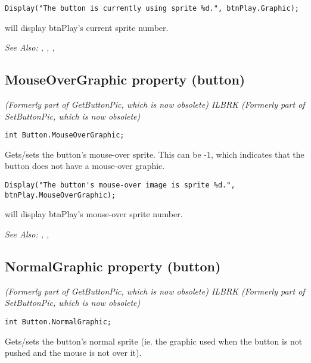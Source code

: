 \begin{verbatim}
Display("The button is currently using sprite %d.", btnPlay.Graphic);
\end{verbatim}
will display btnPlay's current sprite number.

\it{See Also:} ,
,
,


\subsection{MouseOverGraphic property (button)}\label{Button.MouseOverGraphic}%

\it{(Formerly part of GetButtonPic, which is now obsolete)} ILBRK
\it{(Formerly part of SetButtonPic, which is now obsolete)}

\begin{verbatim}
int Button.MouseOverGraphic;
\end{verbatim}
Gets/sets the button's mouse-over sprite. This can be -1, which indicates that the button
does not have a mouse-over graphic.

\begin{verbatim}
Display("The button's mouse-over image is sprite %d.", btnPlay.MouseOverGraphic);
\end{verbatim}
will display btnPlay's mouse-over sprite number.

\it{See Also:} ,
,


\subsection{NormalGraphic property (button)}\label{Button.NormalGraphic}%

\it{(Formerly part of GetButtonPic, which is now obsolete)} ILBRK
\it{(Formerly part of SetButtonPic, which is now obsolete)}

\begin{verbatim}
int Button.NormalGraphic;
\end{verbatim}
Gets/sets the button's normal sprite (ie. the graphic used when the button is not pushed
and the mouse is not over it).

